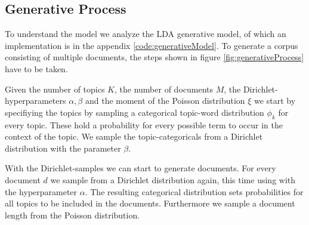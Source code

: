 \documentclass[12 pt,twopage]{article}
\begin{document}
%

\subsection{Generative Process}
To understand the model we analyze the LDA generative model, of which an implementation is in the appendix \ref{code:generativeModel}. To generate a corpus consisting of multiple documents, the steps shown in figure \ref{fig:generativeProcess} have to be taken.

Given the number of topics \(K\), the number of documents \(M\), the Dirichlet-hyperparameters \(\alpha,\beta\) and the moment of the Poisson distribution \( \xi \) we start by specifiying the topics by sampling a categorical topic-word distribution \(\phi_k \) for every topic. These hold a probability for every possible term to occur in the context of the topic. We sample the topic-categoricals from a Dirichlet distribution with the parameter \(\beta\).

With the Dirichlet-samples we can start to generate documents. For every document \( d \) we sample from a Dirichlet distribution again, this time using with the hyperparameter \( \alpha \). The resulting categorical distribution sets probabilities for all topics to be included in the documents. Furthermore we sample a document length from the Poisson distribution.
\end{document}

